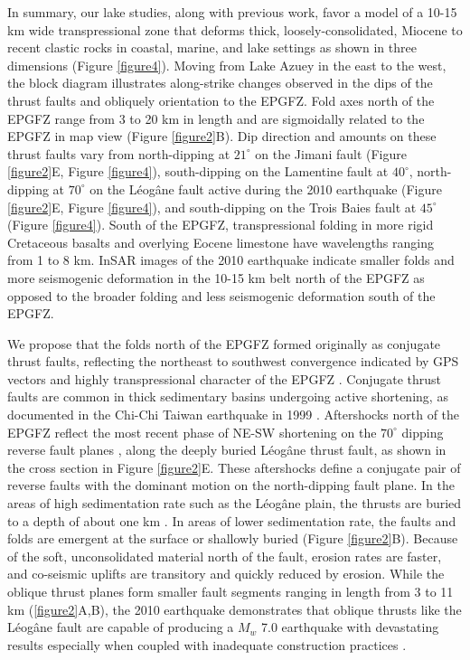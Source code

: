 \documentclass{nature}
\begin{document}
In summary, our lake studies, along with previous work, favor a model of a 10-15 km wide transpressional zone that deforms thick, loosely-consolidated, Miocene to recent clastic rocks in coastal, marine, and lake settings as shown in three dimensions (Figure \ref{figure4}). Moving from Lake Azuey in the east to the west, the block diagram illustrates along-strike changes observed in the dips of the thrust faults and obliquely orientation to the EPGFZ. Fold axes north of the EPGFZ range from 3 to 20 km in length and are sigmoidally related to the EPGFZ in map view (Figure \ref{figure2}B). Dip direction and amounts on these thrust faults vary from north-dipping at $21^{\circ}$ on the Jimani fault (Figure \ref{figure2}E, Figure \ref{figure4}), south-dipping on the Lamentine fault \citep{saint2015seismotectonics} at $40^{\circ}$, north-dipping at $70^{\circ}$ on the L\'eog\^ane fault active during the 2010 earthquake (Figure \ref{figure2}E, Figure \ref{figure4}), and south-dipping on the Trois Baies fault at $45^{\circ}$ (Figure \ref{figure4}). South of the EPGFZ, transpressional folding in more rigid Cretaceous basalts and overlying Eocene limestone have wavelengths ranging from 1 to 8 km. InSAR images of the 2010 earthquake indicate smaller folds and more seismogenic deformation in the 10-15 km belt north of the EPGFZ as opposed to the broader folding and less seismogenic deformation south of the EPGFZ. 

We propose that the folds north of the EPGFZ formed originally as conjugate thrust faults, reflecting the northeast to southwest convergence indicated by GPS vectors and highly transpressional character of the EPGFZ \citep{calais2010transpressional}. Conjugate thrust faults are common in thick sedimentary basins undergoing active shortening, as documented in the Chi-Chi Taiwan earthquake in 1999 \citep{chen2002conjugate}. Aftershocks north of the EPGFZ reflect the most recent phase of NE-SW shortening on the $70^{\circ}$ dipping reverse fault planes \citep{nettles2010earthquake}, along the deeply buried L\'eog\^ane thrust fault, as shown in the cross section in Figure \ref{figure2}E. These aftershocks define a conjugate pair of reverse faults with the dominant motion on the north-dipping fault plane. In the areas of high sedimentation rate such as the L\'eog\^ane plain, the thrusts are buried to a depth of about one km \citep{kocel2014searching}. In areas of lower sedimentation rate, the faults and folds are emergent at the surface or shallowly buried (Figure \ref{figure2}B). Because of the soft, unconsolidated material north of the fault, erosion rates are faster, and co-seismic uplifts are transitory and quickly reduced by erosion. While the oblique thrust planes form smaller fault segments ranging in length from 3 to 11 km (\ref{figure2}A,B), the 2010 earthquake demonstrates that oblique thrusts like the L\'eog\^ane fault are capable of producing a $M_w$ 7.0 earthquake with devastating results especially when coupled with inadequate construction practices \citep{symithe2016present}.
\end{document}
